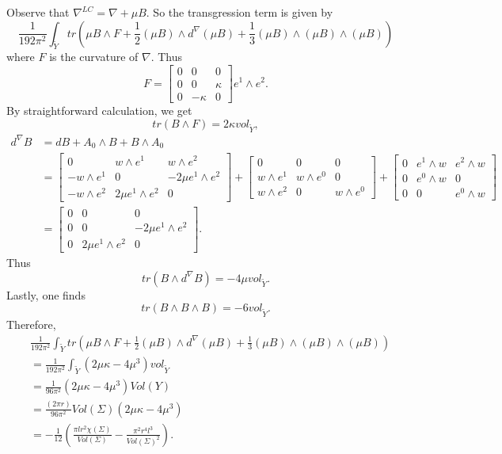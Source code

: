 \documentclass{amsart}
\theoremstyle{definition}
\theoremstyle{remark}
\numberwithin{equation}{section}
\begin{document}
Observe that $\nabla^{LC} = \nabla + \mu B$. So the transgression term is given by
\[
\frac{1}{192\pi^2} \int_{\widetilde{Y}} tr \left( \mu B \wedge F  + \frac{1}{2} (\mu B) \wedge d^{\nabla} (\mu B) + \frac{1}{3} (\mu B) \wedge (\mu B) \wedge (\mu B) \right)
\]
where $F$ is the curvature of $\nabla$. Thus
\[
F = \left[ \begin{matrix} 0 & 0 & 0 \\ 0 & 0 & \kappa \\ 0 & -\kappa & 0 \end{matrix} \right] e^1 \wedge e^2.
\]
By straightforward calculation, we get
\[
tr( B \wedge F) = 2 \kappa vol_{\widetilde{Y}},
\]
\begin{align*}
d^{\nabla} B &= dB + A_0 \wedge B + B \wedge A_0 \\
&= \left[ \begin{matrix} 0 & w \wedge e^1 & w \wedge e^2 \\ -w \wedge e^1 & 0 & -2\mu e^1 \wedge e^2 \\ -w \wedge e^2 & 2 \mu e^1 \wedge e^2 & 0 \end{matrix} \right] + \left[ \begin{matrix} 0 & 0 & 0 \\ w \wedge e^1 & w \wedge e^0 & 0 \\ w \wedge e^2 & 0 & w \wedge e^0 \end{matrix} \right] + \left[ \begin{matrix} 0 & e^1 \wedge w & e^2 \wedge w \\ 0 & e^0 \wedge w & 0 \\ 0 & 0 & e^0 \wedge w \end{matrix} \right] \\
&= \left[ \begin{matrix} 0 & 0 & 0 \\ 0 & 0 & -2\mu e^1 \wedge e^2 \\ 0 & 2\mu e^1 \wedge e^2 & 0 \end{matrix} \right].
\end{align*}
Thus
\[
tr( B \wedge d^{\nabla} B ) = -4 \mu vol_{\widetilde{Y}}.
\]
Lastly, one finds
\[
tr( B \wedge B \wedge B ) = -6 vol_{\widetilde{Y}}.
\]
Therefore,
\begin{align*}
& \frac{1}{192\pi^2} \int_{\widetilde{Y}} tr \left( \mu B \wedge F  + \frac{1}{2} (\mu B) \wedge d^{\nabla} (\mu B) + \frac{1}{3} (\mu B) \wedge (\mu B) \wedge (\mu B) \right) \\
& = \frac{1}{192\pi^2} \int_{\widetilde{Y}} \left( 2\mu \kappa -4 \mu^3 \right) vol_{\widetilde{Y}} \\
&= \frac{1}{96\pi^2}(2\mu \kappa - 4 \mu^3 ) Vol(Y) \\
&= \frac{(2\pi r)}{96\pi^2}Vol(\Sigma)( 2\mu \kappa - 4 \mu^3) \\
&= -\frac{1}{12} \left( \frac{ \pi l r^2 \chi(\Sigma)}{Vol(\Sigma)} - \frac{ \pi^2 r^4 l^3}{Vol(\Sigma)^2} \right).
\end{align*}
\end{document}
